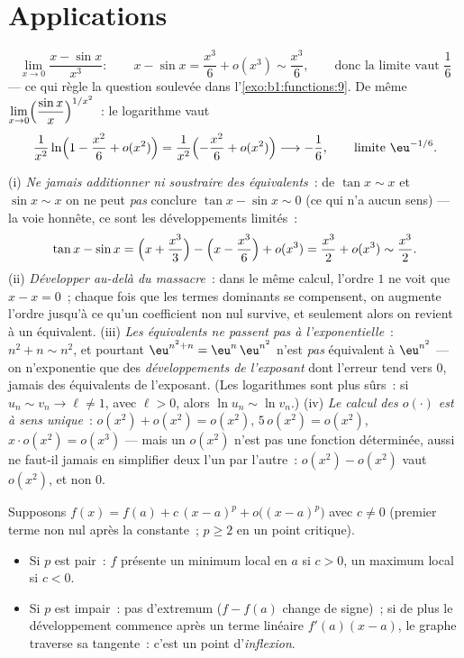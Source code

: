 \section{Applications}

\begin{example}[Limites]\label{ex:b1:taylor:limits}
\[
\lim_{x \to 0} \frac{x - \sin x}{x^3}:
\qquad
x - \sin x = \frac{x^3}{6} + o(x^3) \sim \frac{x^3}{6},
\qquad\text{donc la limite vaut } \frac16
\]
--- ce qui règle la question soulevée dans l'\cref{exo:b1:functions:9}.
De même $\displaystyle\lim_{x\to0}\Bigl(\frac{\sin
x}{x}\Bigr)^{1/x^2}$~: le logarithme vaut
\[
\frac{1}{x^2}\ln\Bigl(1 - \frac{x^2}{6} + o(x^2)\Bigr)
= \frac{1}{x^2}\Bigl(-\frac{x^2}{6} + o(x^2)\Bigr)
\longrightarrow -\frac16,
\qquad\text{limite } \eu^{-1/6}.
\]
\end{example}

\begin{remark}
(i) \emph{Ne jamais additionner ni soustraire des équivalents}~: de
$\tan x \sim x$ et $\sin x \sim x$ on ne peut \emph{pas} conclure
$\tan x - \sin x \sim 0$ (ce qui n'a aucun sens) --- la voie honnête,
ce sont les développements limités~:
\[
\tan x - \sin x
= \Bigl(x + \frac{x^3}{3}\Bigr) - \Bigl(x - \frac{x^3}{6}\Bigr)
+ o(x^3) = \frac{x^3}{2} + o(x^3) \sim \frac{x^3}{2} .
\]
(ii) \emph{Développer au-delà du massacre}~: dans le même calcul,
l'ordre $1$ ne voit que $x - x = 0$~; chaque fois que les termes
dominants se compensent, on augmente l'ordre jusqu'à ce qu'un
coefficient non nul survive, et seulement alors on revient à un
équivalent. (iii) \emph{Les équivalents ne passent pas à
l'exponentielle}~: $n^2 + n \sim n^2$, et pourtant
$\eu^{n^2+n} = \eu^{n}\,\eu^{n^2}$ n'est \emph{pas} équivalent à
$\eu^{n^2}$ --- on n'exponentie que des \emph{développements de
l'exposant} dont l'erreur tend vers $0$, jamais des équivalents de
l'exposant. (Les logarithmes sont plus sûrs~: si $u_n \sim v_n \to
\ell \neq 1$, avec $\ell > 0$, alors $\ln u_n \sim \ln v_n$.) (iv)
\emph{Le calcul des $o(\cdot)$ est à sens unique}~: $o(x^2) + o(x^2) =
o(x^2)$, $5\,o(x^2) = o(x^2)$, $x\cdot o(x^2) = o(x^3)$ --- mais
un $o(x^2)$ n'est pas une fonction déterminée, aussi ne faut-il jamais
en simplifier deux l'un par l'autre~: $o(x^2) - o(x^2)$ vaut $o(x^2)$,
et non $0$.
\end{remark}

\begin{proposition}\label{prop:b1:taylor:local}
Supposons $f(x) = f(a) + c\,(x - a)^p + o\bigl((x-a)^p\bigr)$ avec $c
\neq 0$ (premier terme non nul après la constante~; $p \geq 2$ en un
point critique).
\begin{itemize}
  \item Si $p$ est pair~: $f$ présente un minimum local en $a$ si $c >
        0$, un maximum local si $c < 0$.
  \item Si $p$ est impair~: pas d'extremum ($f - f(a)$ change de
        signe)~; si de plus le développement commence après un terme
        linéaire $f'(a)(x - a)$, le graphe traverse sa tangente~: c'est
        un point d'\emph{inflexion}.
\end{itemize}
\end{proposition}

